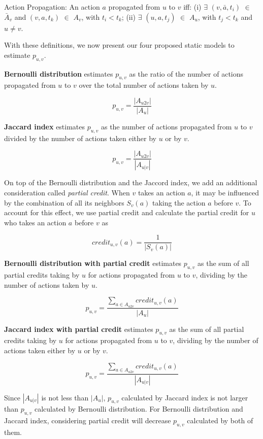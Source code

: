 \begin{definition}{Action Propagation:}
An action $a$ propagated from $u$ to $v$ iff: (i) $\exists$ $(v, \bar{a}, t_i)$ $\in$ $\bar{A}_v$ 
and $(v, a, t_k)$ $\in$ $A_v$, with $t_i < t_k$; (ii) $\exists$ $(u, a, t_j)$ $\in$ $A_u$, with $t_j < t_k$ and $u \neq v$. 
\end{definition}

With these definitions, we now present our four proposed static models to estimate $p_{u,v}$.

{\bf Bernoulli distribution} estimates $p_{u,v}$ as the ratio of the number of actions 
propagated from $u$ to $v$ over the total number of actions taken by $u$.

$$p_{u,v} = \frac{|A_{u2v}|}{|A_u|}$$ 

{\bf Jaccard index} estimates 
$p_{u,v}$ as the number of actions propagated from $u$ to $v$ divided by 
the number of actions taken either by $u$ or by $v$.

$$p_{u,v} = \frac{|A_{u2v}|}{|A_{u|v}|}$$ 

On top of the Bernoulli distribution and the Jaccord index,
we add an additional consideration called {\em partial credit}.
When $v$ takes an action $a$, it may be influenced by the combination of all its neighbors $S_v(a)$ 
taking the action $a$ before $v$. %
To account for this effect, we use partial credit 
and calculate the partial credit for $u$ who takes an action $a$ before $v$ as 

$$credit_{u,v}(a) = \frac{1}{|S_v(a)|}$$

{\bf Bernoulli distribution with partial credit} 
estimates $p_{u,v}$ as the sum of all partial credits taking by $u$ for actions propagated from $u$ to $v$, 
dividing by the number of actions taken by $u$. 

$$p_{u,v} = \frac{\sum\limits_{a \in A_{u2v}}{credit_{u,v}(a)}}{|A_u|}$$

{\bf Jaccard index with partial credit} 
estimates $p_{u,v}$ as the sum of all partial credits taking by $u$ for actions propagated from $u$ to $v$, 
dividing by the number of actions taken either by $u$ or by $v$. 

$$p_{u,v} = \frac{\sum\limits_{a \in A_{u2v}}{credit_{u,v}(a)}}{|A_{u|v}|}$$


Since $|A_{u|v}|$ is not less than $|A_u|$, 
$p_{u,v}$ calculated by Jaccard index is not larger than $p_{u,v}$ calculated by Bernoulli distribution. 
For Bernoulli distribution and Jaccard index, 
considering partial credit will decrease $p_{u,v}$ calculated by both of them. 


